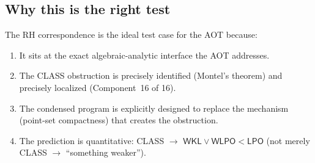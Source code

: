 \documentclass[11pt,a4paper]{article}
\theoremstyle{plain}
\theoremstyle{definition}
\newcommand{\WKL}{\textsf{WKL}}
\newcommand{\WLPO}{\textsf{WLPO}}
\newcommand{\LPO}{\textsf{LPO}}
\newcommand{\CLASS}{\textsf{CLASS}}
\begin{document}
\subsection{Why this is the right test}

The RH correspondence is the ideal test case for the AOT because:
\begin{enumerate}[nosep]
\item It sits at the exact algebraic-analytic interface the AOT addresses.
\item The \CLASS{} obstruction is precisely identified (Montel's theorem) and precisely localized (Component~16 of 16).
\item The condensed program is explicitly designed to replace the mechanism (point-set compactness) that creates the obstruction.
\item The prediction is quantitative: \CLASS{} $\to$ $\WKL \vee \WLPO < \LPO$ (not merely \CLASS{} $\to$ ``something weaker'').
\end{enumerate}
\end{document}
